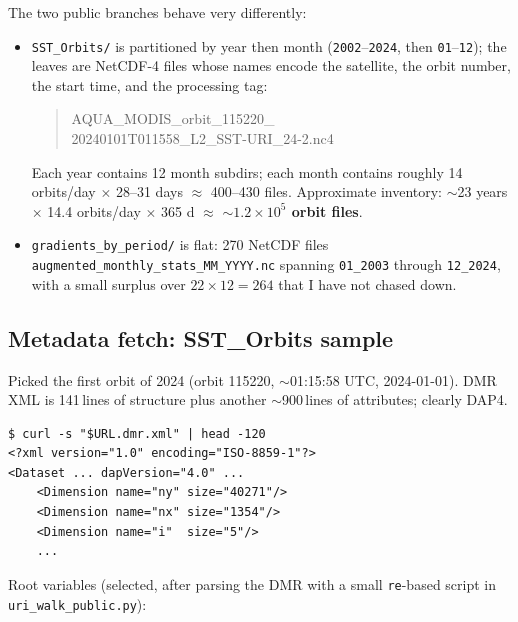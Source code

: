 \documentclass[11pt]{article}
\begin{document}
The two public branches behave very differently:
\begin{itemize}
  \item \texttt{SST\_Orbits/} is partitioned by year then month
    (\texttt{2002}--\texttt{2024}, then \texttt{01}--\texttt{12}); the
    leaves are NetCDF-4 files whose names encode the satellite, the
    orbit number, the start time, and the processing tag:
    \begin{quote}\ttfamily AQUA\_MODIS\_orbit\_115220\_\\20240101T011558\_L2\_SST-URI\_24-2.nc4\end{quote}
    Each year contains 12 month subdirs; each month contains roughly
    14 orbits/day $\times$ 28--31 days $\approx$ 400--430 files.
    Approximate inventory: $\sim$23 years $\times$ 14.4 orbits/day
    $\times$ 365 d $\approx$ \textbf{$\sim 1.2 \times 10^5$ orbit
    files}.
  \item \texttt{gradients\_by\_period/} is flat: 270 NetCDF files
    \texttt{augmented\_monthly\_stats\_MM\_YYYY.nc} spanning
    \texttt{01\_2003} through \texttt{12\_2024}, with a small surplus
    over $22 \times 12 = 264$ that I have not chased down.
\end{itemize}

\subsection{Metadata fetch: SST\_Orbits sample}

Picked the first orbit of 2024 (orbit 115220, $\sim$01:15:58 UTC,
2024-01-01). DMR XML is 141\,lines of structure plus another
$\sim$900\,lines of attributes; clearly DAP4.

\begin{lstlisting}
$ curl -s "$URL.dmr.xml" | head -120
<?xml version="1.0" encoding="ISO-8859-1"?>
<Dataset ... dapVersion="4.0" ...
    <Dimension name="ny" size="40271"/>
    <Dimension name="nx" size="1354"/>
    <Dimension name="i"  size="5"/>
    ...
\end{lstlisting}

Root variables (selected, after parsing the DMR with a small
\texttt{re}-based script in \texttt{uri\_walk\_public.py}):
\end{document}
